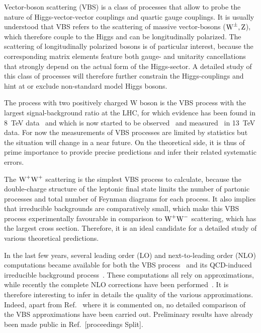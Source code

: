 Vector-boson scattering (VBS) is a class of processes that allow to probe the nature of Higgs-vector-vector couplings and quartic gauge couplings.
It is usually understood that VBS refers to the scattering of massive vector-bosons ($\text{W}^\pm,\text{Z}$), which therefore couple to the Higgs and can be longitudinally polarized.
The scattering of longitudinally polarized bosons is of particular interest, because the corresponding matrix elements feature both gauge- and unitarity cancellations that strongly depend on the actual form of the Higgs-sector.
A detailed study of this class of processes will therefore further constrain the Higgs-couplings and hint at or exclude non-standard model Higgs bosons.

The process with two positively charged W boson is the VBS process with the largest signal-background ratio at the LHC, for which evidence has been found in \SI{8}{\tera\electronvolt} data~\cite{Aad:2014zda,Khachatryan:2014sta} and which is now started to be observed~\cite{Sirunyan:2017ret} and measured~\cite{Aaboud:2016ffv} in \SI{13}{\tera\electronvolt} data.
For now the measurements of VBS processes are limited by statistics but the situation will change in a near future.
On the theoretical side, it is thus of prime importance to provide precise predictions and infer their related systematic errors.

The $\text{W}^+\text{W}^+$ scattering is the simplest VBS process to calculate, because the double-charge structure of the leptonic final state limits the number of partonic processes and total number of Feynman diagrams for each process.
It also implies that irreducible backgrounds are comparatively small, which make this VBS process experimentally favourable in comparison to \eg $\text{W}^+\text{W}^-$ scattering, which has the largest cross section.
Therefore, it is an ideal candidate for a detailed study of various theoretical predictions.

In the last few years, several leading order (LO) and next-to-leading order (NLO) computations became available for both the VBS process~\cite{Jager:2009xx,Jager:2011ms,Denner:2012dz,Rauch:2016pai} and its QCD-induced irreducible background process~\cite{Rauch:2016pai,Melia:2010bm,Melia:2011gk,Campanario:2013gea,Baglio:2014uba}.
These computations all rely on approximations, while recently the complete NLO corrections have been performed~\cite{Biedermann:2017bss}.
It is therefore interesting to infer in details the quality of the various approximations.
Indeed, apart from Ref.~\cite{Biedermann:2017bss} where it is commented on,  no detailed comparison of the VBS approximations have been carried out.
Preliminary results have already been made public in Ref.~[proceedings Split].


